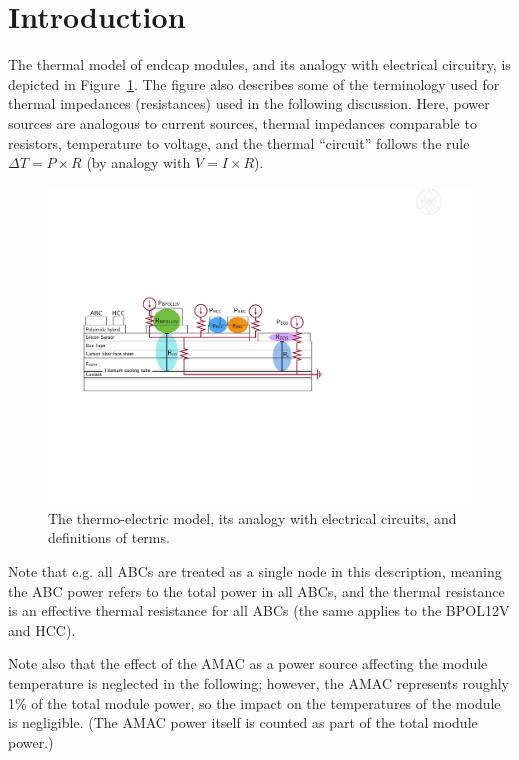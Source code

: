 
\section{Introduction}

The thermal model of endcap modules, and its analogy with electrical circuitry, is depicted in
Figure~\ref{thermoelectric_model}. The figure also describes some of the terminology used for thermal
impedances (resistances) used in the following discussion. Here, power sources are analogous to
current sources, thermal impedances comparable to resistors, temperature to voltage, and the thermal
``circuit'' follows the rule $\Delta T=P\times R$ (by analogy with $V=I\times R$).

\begin{figure}[ht!]
\begin{center}
\includegraphics[width=.80\textwidth]{figures/thermoelectric_model_bpol12v.pdf}
\end{center}
\caption{
The thermo-electric model, its analogy with electrical circuits, and definitions of terms.
}
\label{thermoelectric_model}
\end{figure}

Note that e.g. all ABCs are treated as a single node in this description, meaning the ABC power refers
to the total power in all ABCs, and the thermal resistance is an effective thermal resistance for all
ABCs (the same applies to the BPOL12V and HCC).

Note also that the effect of the AMAC as a power source affecting the module temperature is neglected
in the following; however, the AMAC represents roughly 1\% of the total module power, so the impact on
the temperatures of the module is negligible. (The AMAC power itself is counted as part of the total
module power.)

